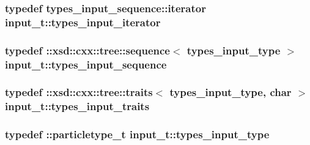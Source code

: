 \subsubsection[{\texorpdfstring{types\+\_\+input\+\_\+iterator}{types_input_iterator}}]{\setlength{\rightskip}{0pt plus 5cm}typedef types\+\_\+input\+\_\+sequence\+::iterator {\bf input\+\_\+t\+::types\+\_\+input\+\_\+iterator}}\hypertarget{classinput__t_a830eb55890cdf67c70880536db78be04}{}\label{classinput__t_a830eb55890cdf67c70880536db78be04}
\subsubsection[{\texorpdfstring{types\+\_\+input\+\_\+sequence}{types_input_sequence}}]{\setlength{\rightskip}{0pt plus 5cm}typedef \+::xsd\+::cxx\+::tree\+::sequence$<$ {\bf types\+\_\+input\+\_\+type} $>$ {\bf input\+\_\+t\+::types\+\_\+input\+\_\+sequence}}\hypertarget{classinput__t_a48f5b9f6b00c9d3749caf0e3a0eac5a7}{}\label{classinput__t_a48f5b9f6b00c9d3749caf0e3a0eac5a7}
\subsubsection[{\texorpdfstring{types\+\_\+input\+\_\+traits}{types_input_traits}}]{\setlength{\rightskip}{0pt plus 5cm}typedef \+::xsd\+::cxx\+::tree\+::traits$<$ {\bf types\+\_\+input\+\_\+type}, char $>$ {\bf input\+\_\+t\+::types\+\_\+input\+\_\+traits}}\hypertarget{classinput__t_a7ab3dea1712373b005d910f827cd9753}{}\label{classinput__t_a7ab3dea1712373b005d910f827cd9753}
\subsubsection[{\texorpdfstring{types\+\_\+input\+\_\+type}{types_input_type}}]{\setlength{\rightskip}{0pt plus 5cm}typedef \+::{\bf particletype\+\_\+t} {\bf input\+\_\+t\+::types\+\_\+input\+\_\+type}}\hypertarget{classinput__t_a516c75c9426ee0026078ebe9ee6f50ea}{}\label{classinput__t_a516c75c9426ee0026078ebe9ee6f50ea}


